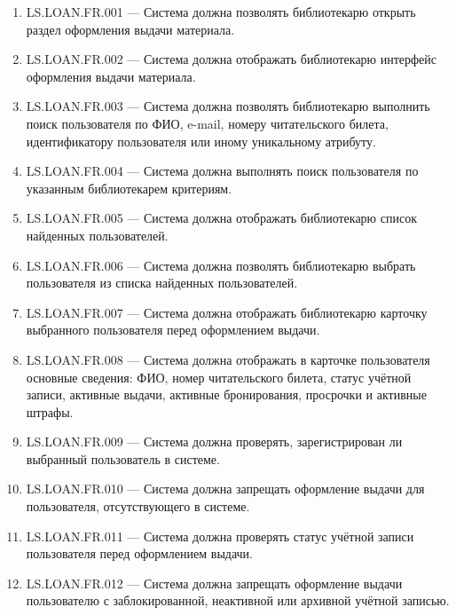 \documentclass[12pt,a4paper]{article}
\begin{document}
	\begin{enumerate}
		\item LS.LOAN.FR.001 --- Система должна позволять библиотекарю открыть раздел
		оформления выдачи материала.
		
		\item LS.LOAN.FR.002 --- Система должна отображать библиотекарю интерфейс
		оформления выдачи материала.
		
		\item LS.LOAN.FR.003 --- Система должна позволять библиотекарю выполнить поиск
		пользователя по ФИО, e-mail, номеру читательского билета, идентификатору
		пользователя или иному уникальному атрибуту.
		
		\item LS.LOAN.FR.004 --- Система должна выполнять поиск пользователя по
		указанным библиотекарем критериям.
		
		\item LS.LOAN.FR.005 --- Система должна отображать библиотекарю список найденных
		пользователей.
		
		\item LS.LOAN.FR.006 --- Система должна позволять библиотекарю выбрать
		пользователя из списка найденных пользователей.
		
		\item LS.LOAN.FR.007 --- Система должна отображать библиотекарю карточку
		выбранного пользователя перед оформлением выдачи.
		
		\item LS.LOAN.FR.008 --- Система должна отображать в карточке пользователя
		основные сведения: ФИО, номер читательского билета, статус учётной записи,
		активные выдачи, активные бронирования, просрочки и активные штрафы.
		
		\item LS.LOAN.FR.009 --- Система должна проверять, зарегистрирован ли выбранный
		пользователь в системе.
		
		\item LS.LOAN.FR.010 --- Система должна запрещать оформление выдачи для
		пользователя, отсутствующего в системе.
		
		\item LS.LOAN.FR.011 --- Система должна проверять статус учётной записи
		пользователя перед оформлением выдачи.
		
		\item LS.LOAN.FR.012 --- Система должна запрещать оформление выдачи пользователю
		с заблокированной, неактивной или архивной учётной записью.
		

\end{enumerate}
\end{document}
